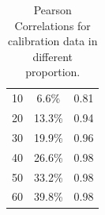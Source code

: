 \begin{table}
\begin{center}
\begin{tabular}{cc|c}
10                                                & 6.6\%                                      & 0.81                                                                                                                                    \\
20                                                & 13.3\%                                     & 0.94 \\
30                                                & 19.9\%                                     & 0.96 \\
40                                                & 26.6\%                                     & 0.98 \\
50                                                & 33.2\%                                     & 0.98                                                                                                                                   \\ 
60                                                & 39.8\%                                     & 0.98 \\ \hline
\end{tabular}
\end{center}
\caption{\label{spearmansen} Pearson Correlations for calibration data in different proportion. 
}
\end{table}

